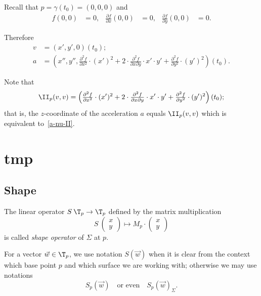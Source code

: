 Recall that $p=\gamma(t_0)=(0,0,0)$ and
\begin{align*}
f(0,0)&=0,
&
\tfrac{\partial f}{\partial x}(0,0)&=0,
&
\tfrac{\partial f}{\partial y}(0,0)&=0.
\end{align*}

Therefore 
\begin{align*}
v&=\left(x',y',0\right)(t_0);
\\
a&=\left(x'',y'',
\tfrac{\partial^2 f}{\partial x^2}\cdot (x')^2
+
2\cdot \tfrac{\partial^2 f}{\partial x\partial y}\cdot x'\cdot y'
+
\tfrac{\partial^2 f}{\partial y^2}\cdot (y')^2\right)(t_0).
\end{align*}

Note that 
\[\II_p(v,v)=\left(\tfrac{\partial^2 f}{\partial x^2}\cdot (x')^2
+
2\cdot \tfrac{\partial^2 f}{\partial x\partial y}\cdot x'\cdot y'
+
\tfrac{\partial^2 f}{\partial y^2}\cdot (y')^2\right)(t_0);\]
that is, the $z$-coordinate of the acceleration $a$ equals $\II_p(v,v)$ which is equivalent to~\ref{a-nu-II}.
\qeds



















\chapter{tmp}

\section{Shape}

The linear operator $S\:\T_p\to \T_p$ defined by the matrix multiplication
\[S\:(\begin{smallmatrix}
x\\y
\end{smallmatrix})
\mapsto
M_p\cdot(\begin{smallmatrix}
x\\y
\end{smallmatrix})\] is called \emph{shape operator} of $\Sigma$ at $p$.

For a vector $\vec w\in\T_p$, we use notation $S(\vec w)$ when it is clear from the context which base point $p$ and which surface we are working with;
otherwise we may use notations 
\[S_p(\vec w)\quad\text{or even}\quad S_p(\vec w)_\Sigma.\]













